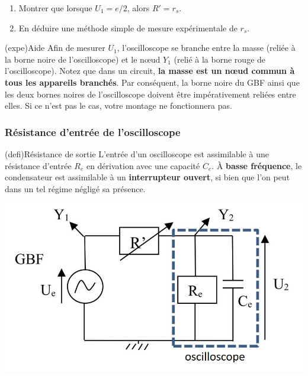\documentclass[../main/main.tex]{subfiles}
\begin{document}
\begin{enumerate}[label=\clenumi]
	\item Montrer que lorsque $U_1 = e/2$, alors $R' = r_{s}$.
	\item En déduire une méthode simple de mesure expérimentale de $r_{s}$.
\end{enumerate}

\begin{tcb}(expe){Aide}
	Afin de mesurer $U_1$, l'oscilloscope se branche entre la masse (reliée à la
	borne noire de l'oscilloscope) et le nœud $Y_1$ (relié à la borne rouge de
	l'oscilloscope). Notez que dans un circuit, \textbf{la masse est un nœud
		commun à tous les appareils branchés}.
	\smallbreak
	Par conséquent, la borne noire du GBF ainsi que les deux bornes noires de
	l'oscilloscope doivent être impérativement reliées entre elles. Si ce n'est
	pas le cas, votre montage ne fonctionnera pas.
\end{tcb}

\subsubsection{Résistance d'entrée de l'oscilloscope}

\begin{tcb}[sidebyside, righthand ratio=.35](defi){Résistance de sortie}
	L'entrée d'un oscilloscope est assimilable à une résistance d'entrée $R_{e}$
	en dérivation avec une capacité $C_{e}$. À \textbf{basse fréquence}, le
	condensateur est assimilable à un \textbf{interrupteur ouvert}, si bien que
	l'on peut dans un tel régime négligé sa présence.
	\tcblower
	\begin{center}
		\includegraphics[width=\linewidth]{res_sortie}
	\end{center}
\end{tcb}
\end{document}
